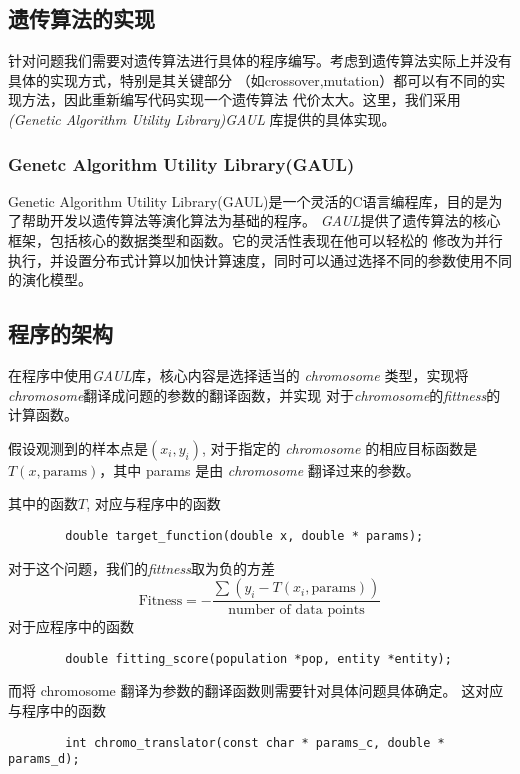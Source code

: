 \documentclass[a4paper]{article}
\begin{document}
\subsection{遗传算法的实现}

针对问题我们需要对遗传算法进行具体的程序编写。考虑到遗传算法实际上并没有具体的实现方式，特别是其关键部分
（如crossover,mutation）都可以有不同的实现方法，因此重新编写代码实现一个遗传算法
代价太大。这里，我们采用 \emph{(Genetic Algorithm Utility Library)GAUL} 库提供的具体实现。

\subsubsection{Genetc Algorithm Utility Library(GAUL)}
Genetic Algorithm Utility
Library(GAUL)是一个灵活的C语言编程库，目的是为了帮助开发以遗传算法等演化算法为基础的程序。
\emph{GAUL}提供了遗传算法的核心框架，包括核心的数据类型和函数。它的灵活性表现在他可以轻松的
修改为并行执行，并设置分布式计算以加快计算速度，同时可以通过选择不同的参数使用不同的演化模型。

\subsection{程序的架构}
在程序中使用\emph{GAUL}库，核心内容是选择适当的 \emph{chromosome}
类型，实现将\emph{chromosome}翻译成问题的参数的翻译函数，并实现
对于\emph{chromosome}的\emph{fittness}的计算函数。

假设观测到的样本点是$(x_i, y_i)$,
对于指定的 \emph{chromosome} 的相应目标函数是$T(x,
\text{params})$，其中
params 是由 \emph{chromosome} 翻译过来的参数。

其中的函数$T$, 对应与程序中的函数
\begin{verbatim}
        double target_function(double x, double * params);
\end{verbatim}

对于这个问题，我们的\emph{fittness}取为负的方差
\begin{equation}
	\text{Fitness} = - \frac{\sum (y_i - T(x_i, \text{params}))}{\text{number of data points}} 
\end{equation}
对于应程序中的函数
\begin{verbatim}
        double fitting_score(population *pop, entity *entity);
\end{verbatim}

而将 chromosome 翻译为参数的翻译函数则需要针对具体问题具体确定。
这对应与程序中的函数
\begin{verbatim}
        int chromo_translator(const char * params_c, double * params_d);
\end{verbatim}
\end{document}
